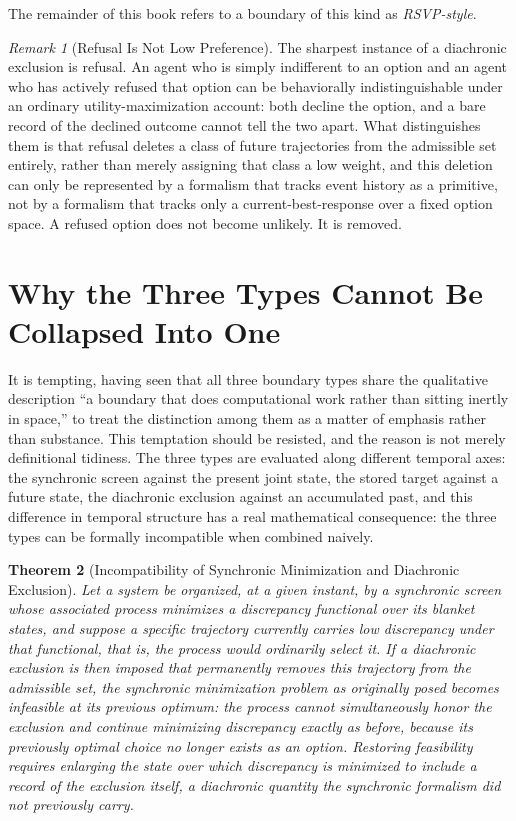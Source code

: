 \documentclass[11pt,fleqn]{book}
\numberwithin{equation}{chapter}
\theoremstyle{plain}
\newtheorem{theorem}{Theorem}[chapter]
\theoremstyle{definition}
\theoremstyle{remark}
\newtheorem{remark}[theorem]{Remark}
\providecommand{\enquote}[1]{``#1''}
\begin{document}
The remainder of this book refers to a boundary of this kind as \emph{RSVP-style}.

\begin{remark}[Refusal Is Not Low Preference]
The sharpest instance of a diachronic exclusion is refusal. An agent who is simply indifferent to an option and an agent who has actively refused that option can be behaviorally indistinguishable under an ordinary utility-maximization account: both decline the option, and a bare record of the declined outcome cannot tell the two apart. What distinguishes them is that refusal deletes a class of future trajectories from the admissible set entirely, rather than merely assigning that class a low weight, and this deletion can only be represented by a formalism that tracks event history as a primitive, not by a formalism that tracks only a current-best-response over a fixed option space. A refused option does not become unlikely. It is removed.
\end{remark}

\section{Why the Three Types Cannot Be Collapsed Into One}

It is tempting, having seen that all three boundary types share the qualitative description \enquote{a boundary that does computational work rather than sitting inertly in space,} to treat the distinction among them as a matter of emphasis rather than substance. This temptation should be resisted, and the reason is not merely definitional tidiness. The three types are evaluated along different temporal axes: the synchronic screen against the present joint state, the stored target against a future state, the diachronic exclusion against an accumulated past, and this difference in temporal structure has a real mathematical consequence: the three types can be formally incompatible when combined naively.

\begin{theorem}[Incompatibility of Synchronic Minimization and Diachronic Exclusion]
Let a system be organized, at a given instant, by a synchronic screen whose associated process minimizes a discrepancy functional over its blanket states, and suppose a specific trajectory currently carries low discrepancy under that functional, that is, the process would ordinarily select it. If a diachronic exclusion is then imposed that permanently removes this trajectory from the admissible set, the synchronic minimization problem as originally posed becomes infeasible at its previous optimum: the process cannot simultaneously honor the exclusion and continue minimizing discrepancy exactly as before, because its previously optimal choice no longer exists as an option. Restoring feasibility requires enlarging the state over which discrepancy is minimized to include a record of the exclusion itself, a diachronic quantity the synchronic formalism did not previously carry.
\end{theorem}
\end{document}
